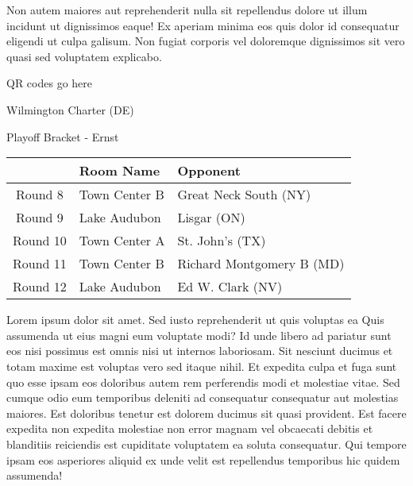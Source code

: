 \documentclass{article}%
\begin{document}
\newline%
Non autem maiores aut reprehenderit nulla sit repellendus dolore ut illum incidunt ut dignissimos eaque! Ex aperiam minima eos quis dolor id consequatur eligendi ut culpa galisum. Non fugiat corporis vel doloremque dignissimos sit vero quasi sed voluptatem explicabo.\newline%
\newline%
%
\vspace*{30pt}%
\begin{center}%
\begin{Huge}%
QR codes go here%
\end{Huge}%
\end{center}%
\newpage%
\begin{center}%
\begin{Huge}%
Wilmington Charter (DE)%
\end{Huge}%
\vspace*{8pt}%
\linebreak%
\begin{Large}%
Playoff Bracket {-} Ernst%
\end{Large}%
\end{center}%
\begin{tabularx}{\textwidth}{|c|Y|Y|}%
\hline%
&Room Name&Opponent\\%
\hline%
Round 8&Town Center B&Great Neck South (NY)\\%
Round 9&Lake Audubon&Lisgar (ON)\\%
Round 10&Town Center A&St. John's (TX)\\%
Round 11&Town Center B&Richard Montgomery B (MD)\\%
Round 12&Lake Audubon&Ed W. Clark (NV)\\%
\hline%
\end{tabularx}%
\vspace*{8pt}%
\linebreak%
\newline%
\newline%
Lorem ipsum dolor sit amet. Sed iusto reprehenderit ut quis voluptas ea Quis assumenda ut eius magni eum voluptate modi? Id unde libero ad pariatur sunt eos nisi possimus est omnis nisi ut internos laboriosam. Sit nesciunt ducimus et totam maxime est voluptas vero sed itaque nihil. Et expedita culpa et fuga sunt quo esse ipsam eos doloribus autem rem perferendis modi et molestiae vitae.\newline%
\newline%
Sed cumque odio eum temporibus deleniti ad consequatur consequatur aut molestias maiores. Est doloribus tenetur est dolorem ducimus sit quasi provident. Est facere expedita non expedita molestiae non error magnam vel obcaecati debitis et blanditiis reiciendis est cupiditate voluptatem ea soluta consequatur. Qui tempore ipsam eos asperiores aliquid ex unde velit est repellendus temporibus hic quidem assumenda!\newline%
\end{document}

